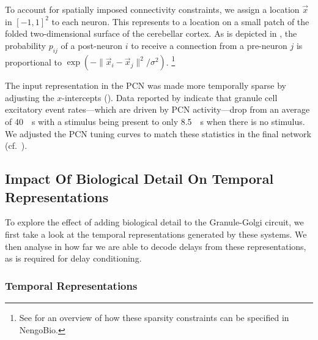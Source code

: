 To account for spatially imposed connectivity constraints, we assign a location $\vec x$ in $[-1, 1]^2$ to each neuron.
This represents to a location on a small patch of the folded two-dimensional surface of the cerebellar cortex.
As is depicted in , the probability $p_{ij}$ of a post-neuron $i$ to receive a connection from a pre-neuron $j$ is proportional to $\exp \left(- \| \vec x_i - \vec x_j \|^2 / \sigma^{2} \right)$.%
\footnote{See  for an overview of how these sparsity constraints can be specified in NengoBio.}

The input representation in the PCN was made more temporally sparse by adjusting the $x$-intercepts ().
Data reported by \citet{chadderton2004integration} indicate that granule cell excitatory event rates---which are driven by PCN activity---drop from an average of \SI{40}{\per\second} with a stimulus being present to only \SI{8.5}{\per\second} when there is no stimulus.
We adjusted the PCN tuning curves to match these statistics in the final network (cf.~).


\subsection{Impact Of Biological Detail On Temporal Representations}

To explore the effect of adding biological detail to the Granule-Golgi circuit, we first take a look at the temporal representations generated by these systems.
We then analyse in how far we are able to decode delays from these representations, as is required for delay conditioning.

\subsubsection{Temporal Representations}

